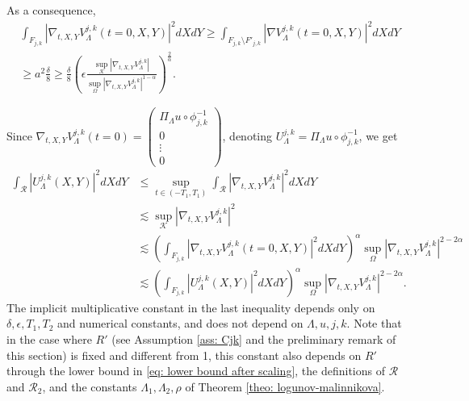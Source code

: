 \documentclass[letterpaper,11pt]{amsart}
\theoremstyle{note}
\numberwithin{equation}{section}
\begin{document}
As a consequence, \begin{multline} \label{eq: L2 bound from below} \int_{F_{j,k}} |\nabla_{t,X,Y} V_\Lambda^{j,k}(t=0, X, Y)|^2 dX dY \geq \int_{F_{j,k} \setminus F'_{j,k}} |\nabla V_\Lambda^{j,k}(t=0, X, Y)|^2 dXdY \\ \geq a^2 \frac{\delta}{8} \geq \frac{\delta}{8} \left( \epsilon \frac{\sup_{\mathcal{K}} |\nabla_{t,X,Y} V_\Lambda^{j,k}|}{\sup_{\Omega} |\nabla_{t,X,Y} V_\Lambda^{j,k}|^{1-\alpha}} \right)^\frac{2}{\alpha}.\end{multline}

Since $\nabla_{t,X,Y} V_\Lambda^{j,k}(t=0) = \begin{pmatrix}\Pi_\Lambda u \circ \phi_{j,k}^{-1} \\ 0 \\ \vdots \\ 0\end{pmatrix}$,
denoting $U_\Lambda^{j,k} = \Pi_\Lambda u \circ \phi_{j,k}^{-1}$, we get $$\begin{aligned}\int_\mathcal{R} |U_\Lambda^{j,k}(X,Y)|^2 dXdY &\leq \sup_{t \in (-T_1, T_1)} \int_{\mathcal{R}} |\nabla_{t,X,Y} V_\Lambda^{j,k}|^2 dXdY \\ &\lesssim \sup_{\mathcal{K}} |\nabla_{t,X,Y} V_\Lambda^{j,k}|^2 \\ &\lesssim \left( \int_{F_{j,k}} |\nabla_{t,X,Y} V_\Lambda^{j,k}(t=0, X, Y)|^2 dX dY\right)^\alpha \sup_{\Omega}|\nabla_{t,X,Y} V_\Lambda^{j,k}|^{2-2\alpha} \\ & \lesssim \left( \int_{F_{j,k}} |U_\Lambda^{j,k}(X, Y)|^2 dX dY\right)^\alpha \sup_{\Omega}|\nabla_{t,X,Y} V_\Lambda^{j,k}|^{2-2\alpha}. \end{aligned}$$ The implicit multiplicative constant in the last inequality depends only on $\delta, \epsilon, T_1, T_2$ and numerical constants, and does not depend on $\Lambda, u, j, k$. Note that in the case where $R'$ (see Assumption \ref{ass: Cjk} and the preliminary remark of this section) is fixed and different from 1, this constant also depends on $R'$ through the lower bound in \eqref{eq: lower bound after scaling}, the definitions of $\mathcal{R}$ and $\mathcal{R}_2$, and the constants $\Lambda_1, \Lambda_2, \rho$ of Theorem \ref{theo: logunov-malinnikova}.
\end{document}
